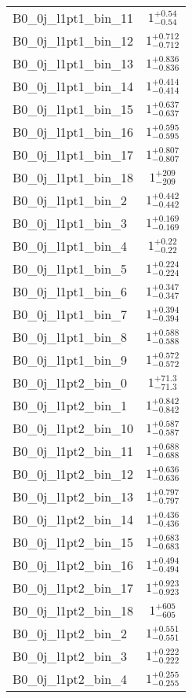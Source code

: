 \begin{tabular}{|l|c|}
B0\_0j\_l1pt1\_bin\_11 & $1^{+0.54}_{-0.54}$ \\
B0\_0j\_l1pt1\_bin\_12 & $1^{+0.712}_{-0.712}$ \\
B0\_0j\_l1pt1\_bin\_13 & $1^{+0.836}_{-0.836}$ \\
B0\_0j\_l1pt1\_bin\_14 & $1^{+0.414}_{-0.414}$ \\
B0\_0j\_l1pt1\_bin\_15 & $1^{+0.637}_{-0.637}$ \\
B0\_0j\_l1pt1\_bin\_16 & $1^{+0.595}_{-0.595}$ \\
B0\_0j\_l1pt1\_bin\_17 & $1^{+0.807}_{-0.807}$ \\
B0\_0j\_l1pt1\_bin\_18 & $1^{+209}_{-209}$ \\
B0\_0j\_l1pt1\_bin\_2 & $1^{+0.442}_{-0.442}$ \\
B0\_0j\_l1pt1\_bin\_3 & $1^{+0.169}_{-0.169}$ \\
B0\_0j\_l1pt1\_bin\_4 & $1^{+0.22}_{-0.22}$ \\
B0\_0j\_l1pt1\_bin\_5 & $1^{+0.224}_{-0.224}$ \\
B0\_0j\_l1pt1\_bin\_6 & $1^{+0.347}_{-0.347}$ \\
B0\_0j\_l1pt1\_bin\_7 & $1^{+0.394}_{-0.394}$ \\
B0\_0j\_l1pt1\_bin\_8 & $1^{+0.588}_{-0.588}$ \\
B0\_0j\_l1pt1\_bin\_9 & $1^{+0.572}_{-0.572}$ \\
B0\_0j\_l1pt2\_bin\_0 & $1^{+71.3}_{-71.3}$ \\
B0\_0j\_l1pt2\_bin\_1 & $1^{+0.842}_{-0.842}$ \\
B0\_0j\_l1pt2\_bin\_10 & $1^{+0.587}_{-0.587}$ \\
B0\_0j\_l1pt2\_bin\_11 & $1^{+0.688}_{-0.688}$ \\
B0\_0j\_l1pt2\_bin\_12 & $1^{+0.636}_{-0.636}$ \\
B0\_0j\_l1pt2\_bin\_13 & $1^{+0.797}_{-0.797}$ \\
B0\_0j\_l1pt2\_bin\_14 & $1^{+0.436}_{-0.436}$ \\
B0\_0j\_l1pt2\_bin\_15 & $1^{+0.683}_{-0.683}$ \\
B0\_0j\_l1pt2\_bin\_16 & $1^{+0.494}_{-0.494}$ \\
B0\_0j\_l1pt2\_bin\_17 & $1^{+0.923}_{-0.923}$ \\
B0\_0j\_l1pt2\_bin\_18 & $1^{+605}_{-605}$ \\
B0\_0j\_l1pt2\_bin\_2 & $1^{+0.551}_{-0.551}$ \\
B0\_0j\_l1pt2\_bin\_3 & $1^{+0.222}_{-0.222}$ \\
B0\_0j\_l1pt2\_bin\_4 & $1^{+0.255}_{-0.255}$ \\

\end{tabular}
